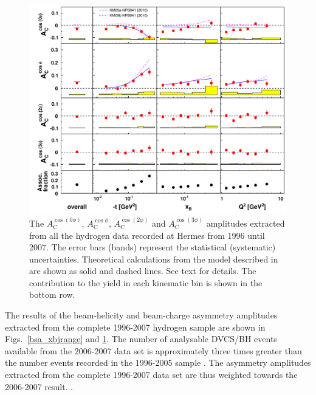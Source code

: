 \begin{figure}
  \begin{center}
    \includegraphics[width=15cm]{bcaplots_eml_par13_bin6_all_release_pic_update_withassoc}
    \caption{The $A_{\textrm{C}}^{\cos(0\phi)}$, $A_{\textrm{C}}^{\cos\phi}$, $A_{\textrm{C}}^{\cos(2\phi)}$ and $A_{\textrm{C}}^{\cos(3\phi)}$  amplitudes extracted from all the hydrogen data recorded at H{\sc ermes} from 1996 until 2007. The error bars (bands) represent the statistical (systematic) uncertainties.  Theoretical calculations from the model described in \cite{Kumericki} are shown as solid and dashed lines. See text for details. The  contribution  to the yield in each kinematic bin is shown in the bottom row.}
  \label{bca_xbjrange}
 \end{center}
\end{figure}
The results of the beam-helicity and beam-charge asymmetry amplitudes extracted from the complete 1996-2007 hydrogen sample are shown in Figs.~\ref{bsa_xbjrange} and \ref{bca_xbjrange}. The number of analysable DVCS/BH events available from the 2006-2007 data set  is approximately three times greater than the number events recorded in the 1996-2005 sample . The  asymmetry amplitudes extracted from the complete 1996-2007 data set are thus weighted towards the 2006-2007 result. .

